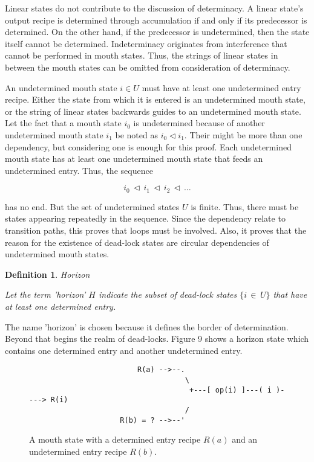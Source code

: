 \documentclass[12pt,a4paper]{scrartcl}
\newtheorem{definition}{Definition}
\begin{document}
Linear states do not contribute to the discussion of determinacy. A linear state's
output recipe is determined through accumulation if and only if its predecessor
is determined. On the other hand, if the predecessor is undetermined, then the 
state itself cannot be determined. Indeterminacy originates from interference 
that cannot be performed in mouth states. Thus, the strings of linear states
in between the mouth states can be omitted from consideration of determinacy.

An undetermined mouth state $i \in U$ must have at least one undetermined entry
recipe. Either the state from which it is entered is an undetermined mouth state, 
or the string of linear states backwards guides to an undetermined mouth state. 
Let the fact that a mouth state $i_0$ is undetermined because of another
undetermined mouth state $i_1$ be noted as $i_0 \vartriangleleft i_1$. Their might
be more than one dependency, but considering one is enough for this proof. Each
undetermined mouth state has at least one undetermined mouth state that feeds
an undetermined entry. Thus, the sequence 

\begin{equation}
    i_0\,\vartriangleleft\,i_1\,\vartriangleleft\,i_2\,\vartriangleleft\,\ldots
\end{equation}

has no end. But the set of undetermined states $U$ is finite. Thus, there must be
states appearing repeatedly in the sequence. Since the dependency relate to transition
paths, this proves that loops must be involved. Also, it proves that the reason
for the existence of dead-lock states are circular dependencies of undetermined mouth states.

\begin{definition}
Horizon

Let the term 'horizon' $H$ indicate the subset of dead-lock states $\{ i\,\in\,U \}$
that have at least one determined entry.
\end{definition}

The name 'horizon' is chosen because it defines the border of determination.
Beyond that begins the realm of dead-locks. Figure 9 shows a horizon state
which contains one determined entry and another undetermined entry.

\begin{figure}[htbp] \leavevmode
\begin{verbatim}
                         R(a) -->--.
                                    \
                                     +---[ op(i) ]---( i )----> R(i)
                                    /
                     R(b) = ? -->--'

\end{verbatim}
\caption{A mouth state with a determined entry recipe $R(a)$ and 
an undetermined entry recipe $R(b)$.}
\end{figure}
\end{document}
